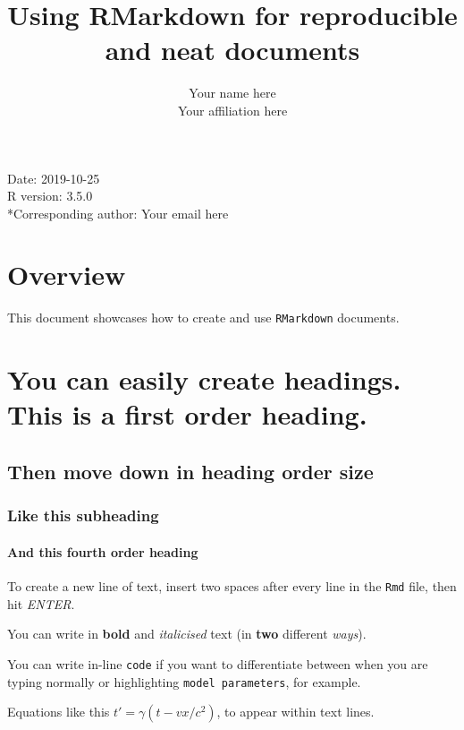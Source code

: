 \documentclass[portrait]{article}
\title{Using RMarkdown for reproducible and neat documents}
\author{Your name here\\
Your affiliation here}
\date{}
\let\oldparagraph\paragraph
\renewcommand{\paragraph}[1]{\oldparagraph{#1}\mbox{}}
\begin{document}
\maketitle

{
\setcounter{tocdepth}{4}
\tableofcontents
}
\newpage   

Date: 2019-10-25\\
R version: 3.5.0\\
*Corresponding author: Your email here

\newpage    

\section{Overview}\label{overview}

This document showcases how to create and use \texttt{RMarkdown}
documents.

\section{You can easily create headings. This is a first order
heading.}\label{you-can-easily-create-headings.-this-is-a-first-order-heading.}

\subsection{Then move down in heading order
size}\label{then-move-down-in-heading-order-size}

\subsubsection{Like this subheading}\label{like-this-subheading}

\paragraph{And this fourth order
heading}\label{and-this-fourth-order-heading}

To create a new line of text, insert two spaces after every line in the
\texttt{Rmd} file, then hit \emph{ENTER}.

You can write in \textbf{bold} and \emph{italicised} text (in
\textbf{two} different \emph{ways}).

You can write in-line \texttt{code} if you want to differentiate between
when you are typing normally or highlighting \texttt{model\ parameters},
for example.

Equations like this \(t' = \gamma(t - vx/c^{2})\), to appear within text
lines.
\end{document}
